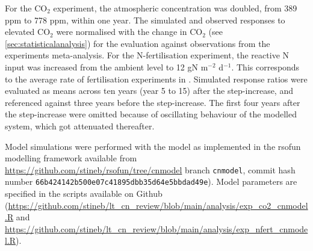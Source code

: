 \documentclass{myreport}
\begin{document}
For the CO$_2$ experiment, the atmospheric concentration was doubled, from 389 ppm to 778 ppm, within one year. The simulated and observed responses to elevated CO$_2$ were normalised with the change in CO$_2$ (see \ref{sec:statisticalanalysis}) for the evaluation against observations from the experiments meta-analysis. For the N-fertilisation experiment, the reactive N input was increased from the ambient level to 12 gN m$^{-2}$ d$^{-1}$. This corresponds to the average rate of fertilisation experiments in \citep{liang_global_2020}. Simulated response ratios were evaluated as means across ten years (year 5 to 15) after the step-increase, and referenced against three years before the step-increase. The first four years after the step-increase were omitted because of oscillating behaviour of the modelled system, which got attenuated thereafter.

Model simulations were performed with the model as implemented in the {rsofun} modelling framework available from \url{https://github.com/stineb/rsofun/tree/cnmodel} branch \texttt{cnmodel}, commit hash number \texttt{66b424142b500e07c41895dbb35d64e5bbdad49e}). Model parameters are specified in the scripts available on Github (\url{https://github.com/stineb/lt_cn_review/blob/main/analysis/exp_co2_cnmodel.R} and \url{https://github.com/stineb/lt_cn_review/blob/main/analysis/exp_nfert_cnmodel.R}).

\clearpage

\end{document}
